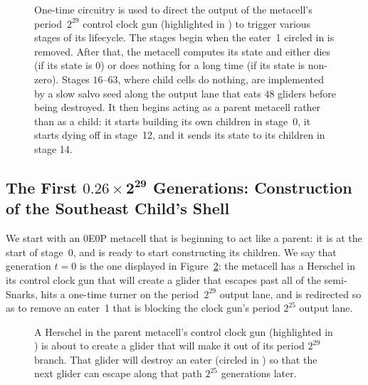 \begin{figure}[!htbp]
	\centering
	\caption{One-time circuitry is used to direct the output of the metacell's period~$2^{29}$ control clock gun (highlighted in ) to trigger various stages of its lifecycle. The stages begin when the eater~1 circled in  is removed. After that, the metacell computes its state and either dies (if its state is 0) or does nothing for a long time (if its state is non-zero). Stages $16$--$63$, where child cells do nothing, are implemented by a slow salvo seed along the output lane that eats $48$ gliders before being destroyed. It then begins acting as a parent metacell rather than as a child: it starts building its own children in stage~0, it starts dying off in stage~12, and it sends its state to its children in stage 14.}
	\label{fig:0e0p_clock_gun_full}
\end{figure}




\subsection{The First $\mathbf{0.26 \times 2^{29}}$ Generations: Construction of the Southeast Child's Shell}\label{sec:0e0p_timeline_shell}

We start with an 0E0P metacell that is beginning to act like a parent: it is at the start of stage~$0$, and is ready to start constructing its children. We say that generation $t = 0$ is the one displayed in Figure~\ref{fig:0e0p_timeline_0}: the metacell has a Herschel in its control clock gun that will create a glider that escapes past all of the semi-Snarks, hits a one-time turner on the period~$2^{29}$ output lane, and is redirected so as to remove an eater~1 that is blocking the clock gun's period $2^{25}$ output lane.

\begin{figure}[!htb]
	\centering
	\caption{A Herschel in the parent metacell's control clock gun (highlighted in ) is about to create a glider that will make it out of its period $2^{29}$ branch. That glider will destroy an eater (circled in ) so that the next glider can escape along that path $2^{25}$ generations later.}
	\label{fig:0e0p_timeline_0}
\end{figure}

